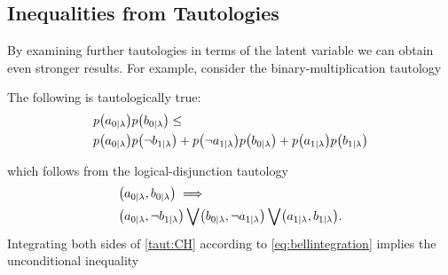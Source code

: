 \begin{EDITING...}
\section{Inequalities from Tautologies}
By examining further tautologies in terms of the latent variable we can obtain even stronger results. For example, consider the binary-multiplication tautology
\begin{taut}\label{taut:CH}The following is tautologically true:
\begin{align*}
&\p{a_{0|\lambda}} \p{b_{0|\lambda}}\leq
\\& \p{a_{0|\lambda}}\p{\nb_{1|\lambda}} + \p{\na_{1|\lambda}}\p{b_{0|\lambda}} + \p{a_{1|\lambda}}\p{b_{1|\lambda}}
\end{align*}
\end{taut}
\noindent which follows from the logical-disjunction tautology
\begin{align}\begin{split}\label{eq:CHtautraw}
&\parens*{a_{0|\lambda} , b_{0|\lambda}} \implies\\& \parens*{a_{0|\lambda} , \nb_{1|\lambda}} \bigvee \parens*{b_{0|\lambda} , \na_{1|\lambda}} \bigvee \parens*{a_{1|\lambda} , b_{1|\lambda}}.
\end{split}\end{align}
Integrating both sides of \cref{taut:CH} according to \cref{eq:bellintegration} implies the unconditional inequality
\begin{align}\label{eq:CHraw}

\end{align}
\end{EDITING...}
